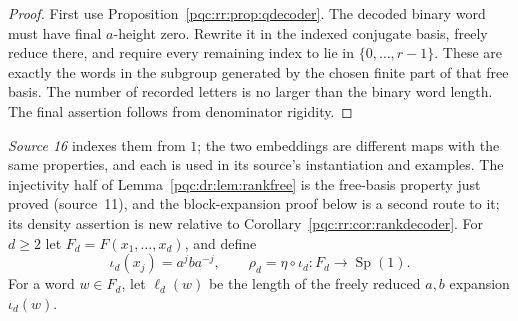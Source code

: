 \documentclass[11pt,letterpaper]{article}
\numberwithin{equation}{section}
\newtheorem{corollary}[theorem]{Corollary}
\theoremstyle{definition}
\theoremstyle{remark}
\newcommand{\Sp}{\operatorname{Sp}}
\begin{document}
\begin{proof}
First use Proposition~\ref{pqc:rr:prop:qdecoder}. The decoded binary word must
have final $a$-height zero. Rewrite it in the indexed conjugate basis,
freely reduce there, and require every remaining index to lie in
$\{0,\ldots,r-1\}$. These are exactly the words in the subgroup generated
by the chosen finite part of that free basis. The number of recorded
letters is no larger than the binary word length. The final assertion
follows from denominator rigidity.
\end{proof}

\emph{Source 16} indexes them from $1$; the two embeddings are different maps
with the same properties, and each is used in its source's instantiation and
examples. The injectivity half of Lemma~\ref{pqc:dr:lem:rankfree} is the
free-basis property just proved (source~11), and the block-expansion proof below
is a second route to it; its density assertion is new relative to
Corollary~\ref{pqc:rr:cor:rankdecoder}.
For $d\geq2$ let $F_d=F(x_1,\ldots,x_d)$, and define
\begin{equation}
 \iota_d(x_j)=a^jba^{-j},\qquad
 \rho_d=\eta\circ\iota_d:F_d\longrightarrow\Sp(1).
 \label{pqc:dr:eq:rankembedding}
\end{equation}
For a word $w\in F_d$, let $\ell_d(w)$ be the length of the freely
reduced $a,b$ expansion $\iota_d(w)$.
\end{document}
